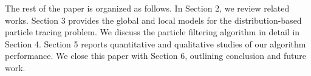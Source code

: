 \documentclass[review]{vgtc}                 %
\begin{document}
The rest of the paper is organized as follows. In Section 2, we review related works. Section 3 provides the global and local models for the distribution-based particle tracing problem. We discuss the particle filtering algorithm in detail in Section 4. Section 5 reports quantitative and qualitative studies of our algorithm performance. We close this paper with Section 6, outlining conclusion and future work.














\end{document}
